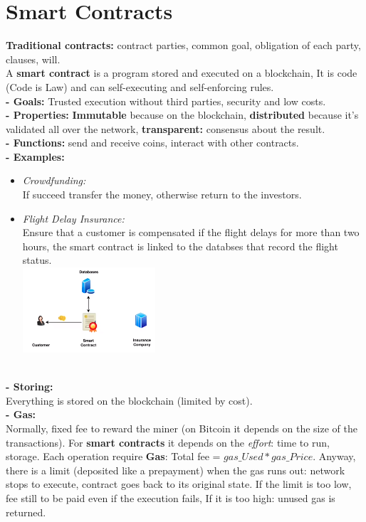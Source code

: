 \documentclass{article}
\begin{document}
\section{Smart Contracts}
\textbf{Traditional contracts:} contract parties, common goal, obligation of each party, clauses, will.\\
A \textbf{smart contract} is a program stored and executed on a blockchain, It is code (Code is Law) and can self-executing and self-enforcing rules.\\
\textbf{- Goals: }Trusted execution without third parties, security and low costs.\\
\textbf{- Properties: }\textbf{Immutable} because on the blockchain, \textbf{distributed} because it's validated all over the network, \textbf{transparent: } consensus about the result.\\
\textbf{- Functions: }send and receive coins, interact with other contracts.\\
\textbf{- Examples: }\\
\begin{itemize}
    \item \textit{Crowdfunding:}\\
    If succeed transfer the money, otherwise return to the investors.\\
    \item \textit{Flight Delay Insurance:}\\
    Ensure that a customer is compensated if the flight delays for more than two hours, the smart contract is linked to the databses that record the flight status.\\
    \includegraphics[scale=0.7]{51.png}\\\\
\end{itemize}
\textbf{- Storing: }\\
Everything is stored on the blockchain (limited by cost).\\
\textbf{- Gas: }\\
Normally, fixed fee to reward the miner (on Bitcoin it depends on the size of the transactions). For \textbf{smart contracts} it depends on the \textit{effort}: time to run, storage. Each operation require \textbf{Gas}: Total fee = $gas\_Used * gas\_Price$. Anyway, there is a limit (deposited like a prepayment) when the gas runs out: network stops to execute, contract goes back to its original state. If the limit is too low, fee still to be paid even if the execution fails, If it is too high: unused gas is returned.
\end{document}
